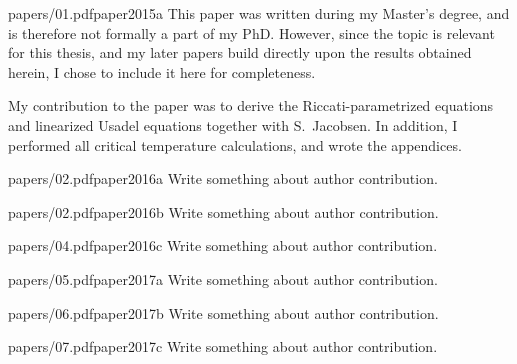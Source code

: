 \begin{paper}{papers/01.pdf}{paper2015a}%
  This paper was written during my Master's degree, and is therefore not formally a part of my PhD.
  However, since the topic is relevant for this thesis, and my later papers build directly upon the results obtained herein, I chose to include it here for completeness.

  My contribution to the paper was to derive the Riccati-parametrized equations and linearized Usadel equations together with S.~Jacobsen.
  In addition, I performed all critical temperature calculations, and wrote the appendices.
\end{paper}

\begin{paper}{papers/02.pdf}{paper2016a}
  Write something about author contribution.
\end{paper}

\begin{paper}{papers/02.pdf}{paper2016b}
  Write something about author contribution.
\end{paper}

\begin{paper}{papers/04.pdf}{paper2016c}
  Write something about author contribution.
\end{paper}

\begin{paper}{papers/05.pdf}{paper2017a}
  Write something about author contribution.
\end{paper}

\begin{paper}{papers/06.pdf}{paper2017b}
  Write something about author contribution.
\end{paper}

\begin{paper}{papers/07.pdf}{paper2017c}
  Write something about author contribution.
\end{paper}

